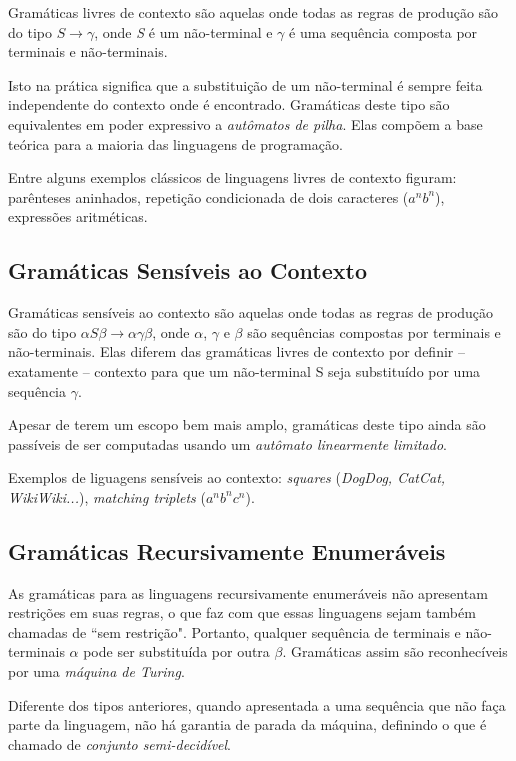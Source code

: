\documentclass[a4paper,12pt,oneside,onecolumn]{uerj}
\begin{document}
Gramáticas livres de contexto são aquelas onde todas as regras de produção são do tipo $S \rightarrow \gamma$, onde \emph{S} é um não-terminal e $\gamma$ é uma sequência composta por terminais e não-terminais. 

Isto na prática significa que a substituição de um não-terminal é sempre feita independente do contexto onde é encontrado. Gramáticas deste tipo são equivalentes em poder expressivo a \emph{autômatos de pilha}. Elas compõem a base teórica para a maioria das linguagens de programação. 

Entre alguns exemplos clássicos de linguagens livres de contexto figuram: parênteses aninhados, repetição condicionada de dois caracteres ($a^nb^n$), expressões aritméticas.

\subsection{Gramáticas Sensíveis ao Contexto}
Gramáticas sensíveis ao contexto são aquelas onde todas as regras de produção são do tipo $\alpha S\beta\rightarrow \alpha\gamma\beta$, onde $\alpha$, $\gamma$ e $\beta$ são sequências compostas por terminais e não-terminais. Elas diferem das gramáticas livres de contexto por definir -- exatamente -- contexto para que um não-terminal S seja substituído por uma sequência $\gamma$. 

Apesar de terem um escopo bem mais amplo, gramáticas deste tipo ainda são passíveis de ser computadas usando um \emph{autômato linearmente limitado}. 

Exemplos de liguagens sensíveis ao contexto: \emph{squares} (\emph{DogDog, CatCat, WikiWiki...}), \emph{matching triplets} ($a^nb^nc^n$).

\subsection{Gramáticas Recursivamente Enumeráveis}

As gramáticas para as linguagens recursivamente enumeráveis não apresentam restrições em suas regras, o que faz com que essas linguagens sejam também chamadas de ``sem restrição". Portanto, qualquer sequência de terminais e não-terminais $\alpha$ pode ser substituída por outra $\beta$. Gramáticas assim são reconhecíveis por uma \emph{máquina de Turing}. 

Diferente dos tipos anteriores, quando apresentada a uma sequência que não faça parte da linguagem, não há garantia de parada da máquina, definindo o que é chamado de \emph{conjunto semi-decidível}.
\end{document}

